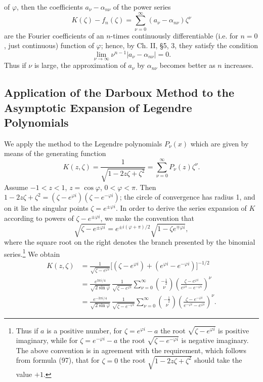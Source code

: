 of $\varphi$, then the coefficients $a_\nu-\alpha_{n\nu}$ of the power series
\[
K(\zeta)-f_n(\zeta)=\sum_{\nu=0}^\infty(a_\nu-\alpha_{n\nu})\zeta^\nu
\]
are the Fourier coefficients of an $n$-times continuously differentiable (i.e. for $n=0$, just continuous) function of $\varphi$; hence, by Ch. II, \S5, 3, they satisfy the condition
\[
\lim_{\nu\to\infty}\nu^{n-1}|a_\nu-\alpha_{n\nu}|=0.
\]
Thus if $\nu$ is large, the approximation of $a_\nu$ by $\alpha_{n\nu}$ becomes better as $n$ increases.

\subsection{Application of the Darboux Method to the Asymptotic Expansion of Legendre Polynomials}
We apply the method to the Legendre polynomials $P_\nu(x)$ which are given by means of the generating function
\begin{equation}\tag{97}
K(z,\zeta)=\frac1{\sqrt{1-2z\zeta+\zeta^2}}
=\sum_{\nu=0}^\infty P_\nu(z)\zeta^\nu.
\end{equation}
Assume $-1<z<1$, $z=\cos\varphi$, $0<\varphi<\pi$. Then
$1-2z\zeta+\zeta^2=(\zeta-e^{\varphi i})(\zeta-e^{-\varphi i})$; the circle of convergence has radius 1, and on it lie the singular points $\zeta=e^{\pm\varphi i}$. In order to derive the series expansion of $K$ according to powers of $\zeta-e^{\pm\varphi i}$, we make the convention that
\[
\sqrt{\zeta-e^{\pm\varphi i}}
=e^{\pm i(\varphi+\pi)/2}\sqrt{1-\zeta e^{\mp\varphi i}},
\]
where the square root on the right denotes the branch presented by the binomial series.\footnote{Thus if $a$ is a positive number, for $\zeta=e^{\varphi i}-a$ the root $\sqrt{\zeta-e^{\varphi i}}$ is positive imaginary, while for $\zeta=e^{-\varphi i}-a$ the root $\sqrt{\zeta-e^{-\varphi i}}$ is negative imaginary. The above convention is in agreement with the requirement, which follows from formula (97), that for $\zeta=0$ the root $\sqrt{1-2z\zeta+\zeta^2}$ should take the value $+1$.}
We obtain
\begin{align*}
K(z,\zeta)
&=\frac1{\sqrt{\zeta-e^{\varphi i}}}
 \bigl[(\zeta-e^{\varphi i})+(e^{\varphi i}-e^{-\varphi i})\bigr]^{-1/2}\\
&=\frac{e^{3\pi i/4}}{\sqrt{2\sin\varphi}}\,
 \frac1{\sqrt{\zeta-e^{\varphi i}}}
 \sum_{\nu=0}^\infty\binom{-\tfrac12}{\nu}
 \left(\frac{\zeta-e^{\varphi i}}{e^{\varphi i}-e^{-\varphi i}}\right)^\nu\\
&=\frac{e^{-3\pi i/4}}{\sqrt{2\sin\varphi}}\,
 \frac1{\sqrt{\zeta-e^{-\varphi i}}}
 \sum_{\nu=0}^\infty\binom{-\tfrac12}{\nu}
 \left(\frac{\zeta-e^{-\varphi i}}{e^{-\varphi i}-e^{\varphi i}}\right)^\nu.
\end{align*}

